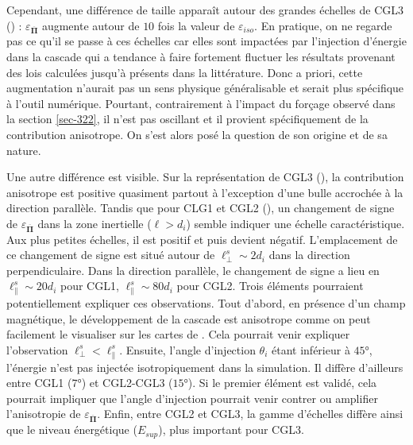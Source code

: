  Cependant, une différence de taille apparaît autour des grandes échelles de CGL3 () : $\varepsilon_{\overline{\boldsymbol{\Pi}}}$ augmente autour de $\num{10}$ fois la valeur de $\varepsilon_{iso}$. En pratique, on ne regarde pas ce qu'il se passe à ces échelles car elles sont impactées par l'injection d'énergie dans la cascade qui a tendance à faire fortement fluctuer les résultats provenant des lois calculées jusqu'à présents dans la littérature. Donc a priori, cette augmentation n'aurait pas un sens physique généralisable et serait plus spécifique à l'outil numérique. Pourtant, contrairement à l'impact du forçage observé dans la section \ref{sec-322}, il n'est pas oscillant et il provient spécifiquement de la contribution anisotrope. On s'est alors posé la question de son origine et de sa nature.
 
 Une autre différence est visible. Sur la représentation  de CGL3 (), la contribution anisotrope est positive quasiment partout à l'exception d'une \og bulle \fg{} accrochée à la direction parallèle. Tandis que pour CLG1 et CGL2 (), un changement de signe de $\varepsilon_{\overline{\boldsymbol{\Pi}}}$ dans la zone inertielle  ($\ell > d_i$) semble indiquer une échelle caractéristique. Aux plus petites échelles, il est positif et puis devient négatif. L'emplacement de ce changement de signe est situé autour de $\ell^{s}_{\perp} \sim 2d_i$ dans la direction perpendiculaire. Dans la direction parallèle, le changement de signe a lieu en $\ell^{s}_{\parallel} \sim 20d_i$ pour CGL1, $\ell^{s}_{\parallel} \sim 80d_i$ pour CGL2. Trois éléments pourraient potentiellement expliquer ces observations. 
Tout d'abord, en présence d'un champ magnétique, le développement de la cascade est anisotrope comme on peut facilement le visualiser sur les cartes de \cite{manzini_local_2022}. Cela pourrait venir expliquer l'observation $\ell^{s}_{\perp}<\ell^{s}_{\parallel}$. Ensuite, l'angle d'injection $\theta_i$ étant inférieur à $\ang{45}$, l'énergie n'est pas injectée isotropiquement dans la simulation. Il diffère d'ailleurs entre CGL1 ($\ang{7}$) et CGL2-CGL3 ($\ang{15}$). Si le premier élément est validé, cela pourrait impliquer que l'angle d'injection pourrait venir contrer ou amplifier l'anisotropie de $\varepsilon_{\overline{\boldsymbol{\Pi}}}$. Enfin, entre CGL2 et CGL3, la gamme d'échelles diffère ainsi que le niveau énergétique ($E_{sup}$), plus important pour CGL3.

